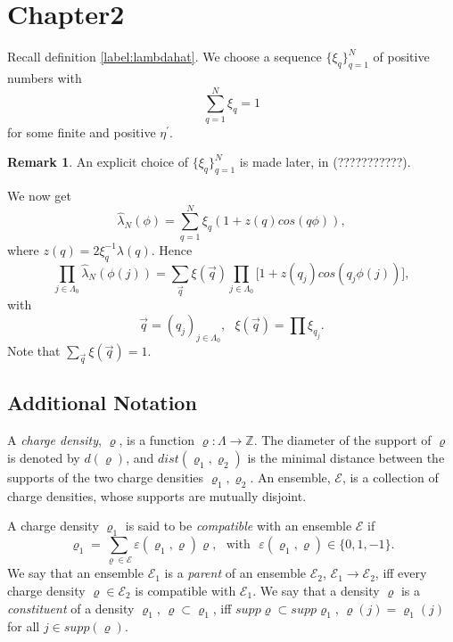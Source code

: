 \documentclass[11pt,reqno]{article}
\DeclarePairedDelimiter\abs{\lvert}{\rvert}%
\theoremstyle{definition}
\newtheorem*{remark}{Remark}
\numberwithin{equation}{section}
\begin{document}
\section{Chapter2}\label{sec:chap2}
\newcommand*{\ens}{\mathscr{N}}

Recall definition \eqref{label:lambdahat}.
We choose a sequence $\{\xi_q\}_{q=1}^N$ of positive numbers with
$$
\sum_{q=1}^N \xi_q = 1 
$$
for some finite and positive $\eta^\prime$.
\begin{remark}
An explicit choice of $\{\xi_q\}_{q=1}^N$ is made later, in (???????????).
\end{remark}

We now get
$$
\hat{\lambda}_N(\phi) = \sum_{q=1}^N \xi_q(1 + z(q)cos(q\phi)),
$$
where $z(q) = 2 \xi_q^{-1} \lambda(q)$. Hence 
\begin{equation} \label{label:eq52}
\prod_{j \in \Lambda_0} \hat{\lambda}_N(\phi(j)) = \sum_{\vec{q}} \xi(\vec{q}) \prod_{j \in \Lambda_0} \big[ 1 + z(q_j)cos(q_j\phi(j)) \big],
\end{equation}
with
$$
\vec{q} = (q_j)_{j \in \Lambda_0}, \ \ \ \xi(\vec{q}) = \prod \xi_{q_j}.
$$
Note that $\sum_{\vec{q}} \xi(\vec{q}) = 1$.

\subsection{Additional Notation}
A \textit{charge density}, $\varrho$, is a function $\varrho:\Lambda \rightarrow \mathbb{Z}$. The diameter of the support of $\varrho$ is denoted by $d(\varrho)$, and $dist(\varrho_1, \varrho_2)$ is the minimal distance between the supports of the two charge densities $\varrho_1, \varrho_2$. An ensemble, $\mathscr{E}$, is a collection of charge densities, whose supports are mutually disjoint. 

A charge density $\varrho_1$ is said to be \textit{compatible} with an ensemble $\mathscr{E}$ if
$$
\varrho_1 = \sum_{\varrho \in \mathscr{E}} \varepsilon(\varrho_1, \varrho)\varrho, \ \ \ \text{with} \ \ \ \varepsilon(\varrho_1, \varrho) \in \{0,1,-1\}.
$$
We say that an ensemble $\mathscr{E}_1$ is a \textit{parent} of an ensemble $\mathscr{E}_2$, $\mathscr{E}_1 \rightarrow \mathscr{E}_2$, iff every charge density $\varrho \in \mathscr{E}_2$ is compatible with $\mathscr{E}_1$. We say that a density $\varrho$ is a \textit{constituent} of a density $\varrho_1$, $\varrho \subset \varrho_1$, iff $supp\varrho \subset supp\varrho_1$, $\varrho(j) = \varrho_1(j)$ for all $j \in supp(\varrho)$.
\end{document}
